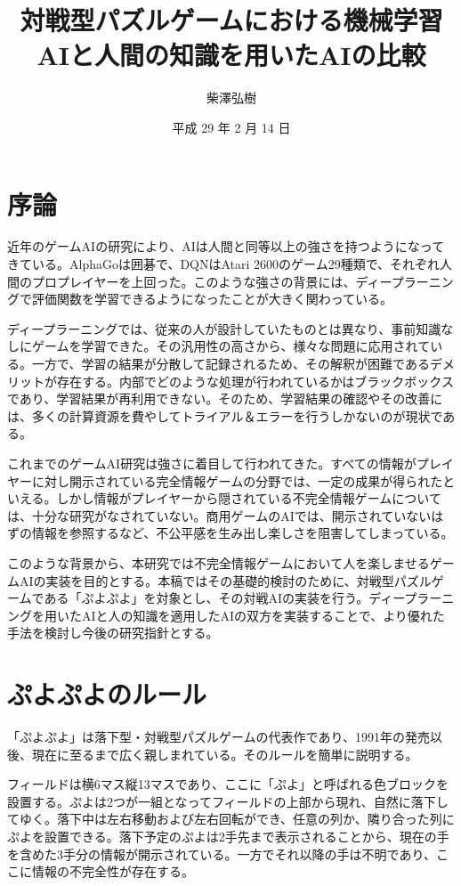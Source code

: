 \documentclass[twocolumn, a4paper]{UECIEresume}
\title{対戦型パズルゲームにおける機械学習AIと人間の知識を用いたAIの比較}
\date{平成 29 年 2 月 14 日}
\affiliation{総合情報学科 メディア情報学 コース}
\author{柴澤弘樹}
\begin{document}
\maketitle

\section{序論}
近年のゲームAIの研究により、AIは人間と同等以上の強さを持つようになってきている。AlphaGo\cite{alphaGo}は囲碁で、DQN\cite{dqn}はAtari 2600のゲーム29種類で、それぞれ人間のプロプレイヤーを上回った。このような強さの背景には、ディープラーニングで評価関数を学習できるようになったことが大きく関わっている。

ディープラーニングでは、従来の人が設計していたものとは異なり、事前知識なしにゲームを学習できた。その汎用性の高さから、様々な問題に応用されている。一方で、学習の結果が分散して記録されるため、その解釈が困難であるデメリットが存在する。内部でどのような処理が行われているかはブラックボックスであり、学習結果が再利用できない。そのため、学習結果の確認やその改善には、多くの計算資源を費やしてトライアル＆エラーを行うしかないのが現状である。

これまでのゲームAI研究は強さに着目して行われてきた。すべての情報がプレイヤーに対し開示されている完全情報ゲームの分野では、一定の成果が得られたといえる。しかし情報がプレイヤーから隠されている不完全情報ゲームについては、十分な研究がなされていない。商用ゲームのAIでは、開示されていないはずの情報を参照するなど、不公平感を生み出し楽しさを阻害してしまっている。

このような背景から、本研究では不完全情報ゲームにおいて人を楽しませるゲームAIの実装を目的とする。本稿ではその基礎的検討のために、対戦型パズルゲームである「ぷよぷよ」を対象とし、その対戦AIの実装を行う。ディープラーニングを用いたAIと人の知識を適用したAIの双方を実装することで、より優れた手法を検討し今後の研究指針とする。

\section{ぷよぷよのルール}
「ぷよぷよ」は落下型・対戦型パズルゲームの代表作であり、1991年の発売以後、現在に至るまで広く親しまれている。そのルールを簡単に説明する。

フィールドは横6マス縦13マスであり、ここに「ぷよ」と呼ばれる色ブロックを設置する。ぷよは2つが一組となってフィールドの上部から現れ、自然に落下してゆく。落下中は左右移動および左右回転ができ、任意の列か、隣り合った列にぷよを設置できる。落下予定のぷよは2手先まで表示されることから、現在の手を含めた3手分の情報が開示されている。一方でそれ以降の手は不明であり、ここに情報の不完全性が存在する。
\end{document}

